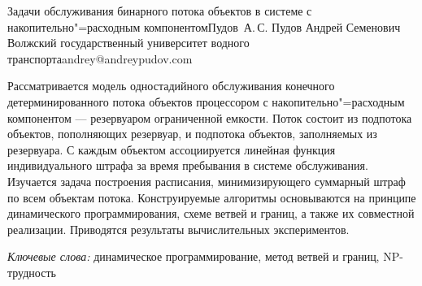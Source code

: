 \begin{ptkarticle}%
{Задачи обслуживания бинарного потока объектов в системе с накопительно"=расходным компонентом}{Пудов~А.\,С.}
\OneAuthor%
{Пудов Андрей Семенович}%
    {Волжский государственный университет водного транспорта}{andrey@andreypudov.com}%

Рассматривается модель одностадийного обслуживания конечного детерминированного потока объектов процессором с накопительно"=расходным компонентом --- резервуаром ограниченной емкости. Поток состоит из подпотока объектов, пополняющих резервуар, и подпотока объектов, заполняемых из резервуара. С каждым объектом ассоциируется линейная функция индивидуального штрафа за время пребывания в системе обслуживания. Изучается задача построения расписания, минимизирующего суммарный штраф по всем объектам потока. Конструируемые алгоритмы основываются на принципе динамического программирования, схеме ветвей и границ, а также их совместной реализации. Приводятся результаты вычислительных экспериментов.

{\itshape Ключевые слова:} динамическое программирование, метод ветвей и границ, NP-трудность






\end{ptkarticle}
